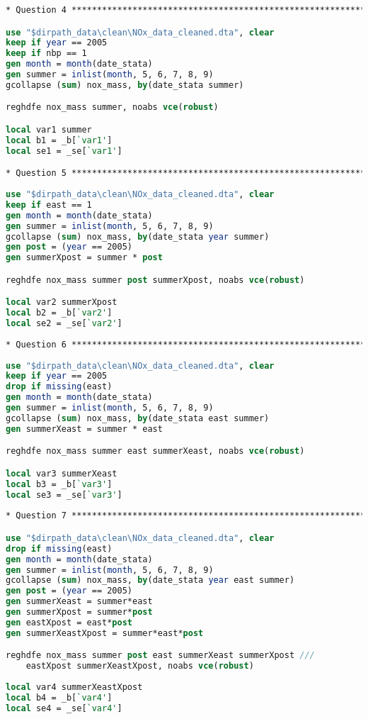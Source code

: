 \documentclass[12pt]{article}
\begin{document}
\begin{lstlisting}[language=Stata, numbers=none]
* Question 4 ***************************************************************

use "$dirpath_data\clean\NOx_data_cleaned.dta", clear
keep if year == 2005 
keep if nbp == 1  
gen month = month(date_stata)
gen summer = inlist(month, 5, 6, 7, 8, 9)
gcollapse (sum) nox_mass, by(date_stata summer)

reghdfe nox_mass summer, noabs vce(robust)

local var1 summer
local b1 = _b[`var1']
local se1 = _se[`var1']

* Question 5 ***************************************************************
	
use "$dirpath_data\clean\NOx_data_cleaned.dta", clear
keep if east == 1 
gen month = month(date_stata)
gen summer = inlist(month, 5, 6, 7, 8, 9)
gcollapse (sum) nox_mass, by(date_stata year summer)
gen post = (year == 2005)
gen summerXpost = summer * post

reghdfe nox_mass summer post summerXpost, noabs vce(robust)

local var2 summerXpost
local b2 = _b[`var2']
local se2 = _se[`var2']
	
* Question 6 ***************************************************************
	
use "$dirpath_data\clean\NOx_data_cleaned.dta", clear
keep if year == 2005
drop if missing(east)
gen month = month(date_stata)
gen summer = inlist(month, 5, 6, 7, 8, 9)
gcollapse (sum) nox_mass, by(date_stata east summer)
gen summerXeast = summer * east

reghdfe nox_mass summer east summerXeast, noabs vce(robust)

local var3 summerXeast
local b3 = _b[`var3']
local se3 = _se[`var3']
	
* Question 7 ***************************************************************

use "$dirpath_data\clean\NOx_data_cleaned.dta", clear
drop if missing(east)
gen month = month(date_stata)
gen summer = inlist(month, 5, 6, 7, 8, 9)
gcollapse (sum) nox_mass, by(date_stata year east summer)
gen post = (year == 2005)
gen summerXeast = summer*east 
gen summerXpost = summer*post 
gen eastXpost = east*post
gen summerXeastXpost = summer*east*post 

reghdfe nox_mass summer post east summerXeast summerXpost ///
	eastXpost summerXeastXpost, noabs vce(robust)
	
local var4 summerXeastXpost
local b4 = _b[`var4']
local se4 = _se[`var4']
	

\end{lstlisting}
\end{document}
